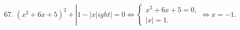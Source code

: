 67. $(x^2+6x+5)^2+\left|1-|x|
ight|=0 \Leftrightarrow \begin{cases} x^2+6x+5=0,\\ |x|=1.\end{cases}\Leftrightarrow x=-1.$\\
